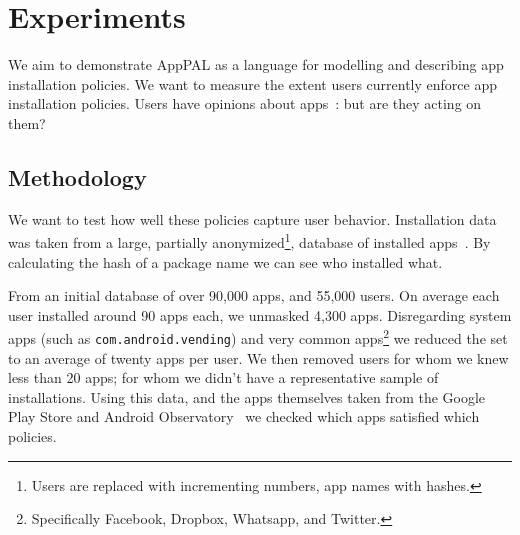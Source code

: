 \documentclass[]{soups-poster}
\newcommand{\citep}[1]{\cite{#1}}
\begin{document}
%

\section{Experiments}

We aim to demonstrate AppPAL as a language for modelling and describing app installation policies. 
We want to measure the extent users currently enforce app installation policies.
Users have opinions about apps~\citep{Sadeh:2014vq}: but are they acting on them?

\subsection{Methodology}

We want to test how well these policies capture user behavior.
Installation data was taken from a large, partially anonymized\footnote{Users are replaced with incrementing numbers, app names with hashes.}, database of installed apps~\citep{Oliner:2013ht}.
By calculating the hash of a package name we can see who installed what.

From an initial database of over 90,000 apps, and 55,000 users.
On average each user installed around 90 apps each, we unmasked 4,300 apps.
Disregarding system apps (such as \texttt{com.android.vending}) and very common apps\footnote{Specifically Facebook, Dropbox, Whatsapp, and Twitter.} we reduced the set to an average of twenty apps per user.
We then removed users for whom we knew less than 20 apps; for whom we didn't have a representative sample of installations.
Using this data, and the apps themselves taken from the Google Play Store and Android Observatory~\citep{Barrera:2012iba} we checked which apps satisfied which policies.
\end{document}
